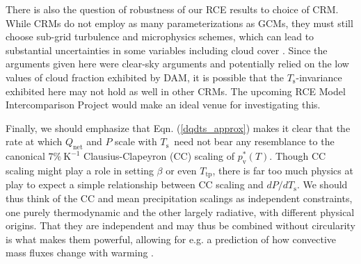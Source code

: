 \documentclass[9pt,twocolumn,twoside,lineno]{pnas-new}
\newcommand{\eqnref}[1]{(\ref{#1})}
\newcommand{\Qnet}{\ensuremath{Q_\mathrm{net}}}
\newcommand{\Kinverse}{\ensuremath{\mathrm{K^{-1}}}}
\newcommand{\pvstar}{\ensuremath{p^*_{\mathrm{v}}}}
\newcommand{\Ts}{\ensuremath{T_\mathrm{s}}}
\newcommand{\Ttp}{\ensuremath{T_\mathrm{tp}}}
\begin{document}
There is also the question of robustness of our RCE results to choice of CRM. While CRMs do not employ as many parameterizations as GCMs, they must still choose sub-grid turbulence and microphysics schemes, which can lead to substantial uncertainties in some variables including cloud cover \cite[e.g.][]{tsushima2015, igel2014}. Since the arguments given here were clear-sky arguments and potentially relied on the low values of  cloud fraction exhibited by DAM, it is possible that the \Ts-invariance exhibited here may not hold as well in other CRMs. The upcoming RCE Model Intercomparison Project \cite[RCEMIP,][]{wing2017b} would make an ideal venue for investigating this.

Finally, we should emphasize that Eqn. \eqnref{dqdts_approx} makes it clear that the rate at which $\Qnet$ and $P$ scale with \Ts\ need not bear any resemblance to the  canonical $7\%\ \Kinverse$ Clausius-Clapeyron (CC) scaling of $\pvstar(T)$. Though CC scaling might play a role in setting $\beta$ or even \Ttp, there is far too much physics at play to expect a simple relationship between CC scaling and $dP/d\Ts$. We should thus think of  the CC and mean precipitation scalings  as independent constraints, one purely thermodynamic and the other largely radiative, with different physical origins. That they are independent and may thus be combined without circularity is what makes them powerful, allowing for e.g. a prediction of how convective mass fluxes change with warming \cite[][]{held2006}.

%
\end{document}
